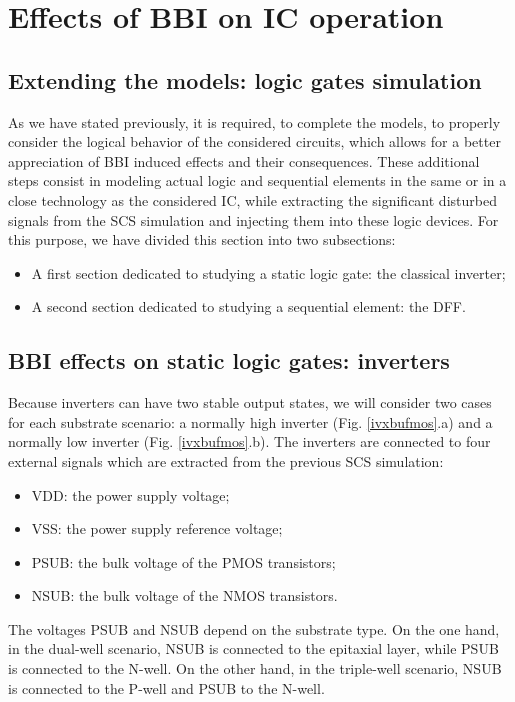 
\section{Effects of BBI on IC operation}
\subsection{Extending the models: logic gates simulation}
	As we have stated previously, it is required, to complete the models, to properly consider the logical behavior of the considered circuits, which allows for a better appreciation of BBI induced effects and their consequences.
	These additional steps consist in modeling actual logic and sequential elements in the same or in a close technology as the considered IC, while extracting the significant disturbed signals from the SCS simulation and injecting them into these logic devices.
	For this purpose, we have divided this section into two subsections:
	\begin{itemize}
		\item A first section dedicated to studying a static logic gate: the classical inverter;
		\item A second section dedicated to studying a sequential element: the DFF.
	\end{itemize}

\subsection{BBI effects on static logic gates: inverters}
	
	Because inverters can have two stable output states, we will consider two cases for each substrate scenario: a normally high inverter (Fig. \ref{ivxbufmos}.a) and a normally low inverter (Fig. \ref{ivxbufmos}.b).
	The inverters are connected to four external signals which are extracted from the previous SCS simulation:
	\begin{itemize}
			\item VDD: the power supply voltage;
			\item VSS: the power supply reference voltage;
			\item PSUB: the bulk voltage of the PMOS transistors;
			\item NSUB: the bulk voltage of the NMOS transistors.
		\end{itemize}
	The voltages PSUB and NSUB depend on the substrate type.
	On the one hand, in the dual-well scenario, NSUB is connected to the epitaxial layer, while PSUB is connected to the N-well.
	On the other hand, in the triple-well scenario, NSUB is connected to the P-well and PSUB to the N-well.


